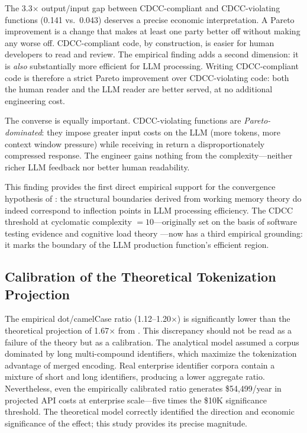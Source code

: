 \documentclass[11pt,a4paper]{article}
\begin{document}
The 3.3$\times$ output/input gap between CDCC-compliant and CDCC-violating
functions (0.141 vs.\ 0.043) deserves a precise economic interpretation.
A Pareto improvement is a change that makes at least one party better off
without making any worse off. CDCC-compliant code, by construction, is easier
for human developers to read and review. The empirical finding adds a second
dimension: it is \emph{also} substantially more efficient for LLM processing.
Writing CDCC-compliant code is therefore a strict Pareto improvement over
CDCC-violating code: both the human reader and the LLM reader are better
served, at no additional engineering cost.

The converse is equally important. CDCC-violating functions are
\emph{Pareto-dominated}: they impose greater input costs on the LLM
(more tokens, more context window pressure) while receiving in return a
disproportionately compressed response. The engineer gains nothing from
the complexity---neither richer LLM feedback nor better human readability.

This finding provides the first direct empirical support for the convergence
hypothesis of \citet{pereira2026b}: the structural boundaries derived from
working memory theory \citep{miller1956,sweller1988} do indeed correspond to
inflection points in LLM processing efficiency. The CDCC threshold at
cyclomatic complexity $= 10$---originally set on the basis of software testing
evidence \citep{watson1996} and cognitive load theory \citep{sweller1988}---now
has a third empirical grounding: it marks the boundary of the LLM production
function's efficient region.

\subsection{Calibration of the Theoretical Tokenization Projection}

The empirical dot/camelCase ratio (1.12--1.20$\times$) is significantly
lower than the theoretical projection of 1.67$\times$ from
\citet{pereira2026a}. This discrepancy should not be read as a failure of the
theory but as a calibration. The analytical model assumed a corpus dominated
by long multi-compound identifiers, which maximize the tokenization advantage
of merged encoding. Real enterprise identifier corpora contain a mixture of
short and long identifiers, producing a lower aggregate ratio. Nevertheless,
even the empirically calibrated ratio generates \$54,499/year in projected
API costs at enterprise scale---five times the \$10K significance threshold.
The theoretical model correctly identified the direction and economic
significance of the effect; this study provides its precise magnitude.
\end{document}
